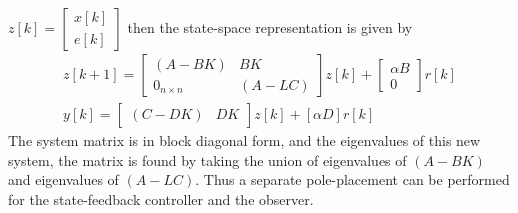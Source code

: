 \documentclass[twoside]{article}
\begin{document}
$z[k] = \left[ \begin{array}{c} x[k] \\ e[k] \end{array} \right]$
then the state-space representation is given by
%
\begin{align*}
  z[k+1] = \left[ \begin{array}{cc} (A - B K) & B K\\ 0_{n \times n}
                                              & (A - LC) \end{array}
                                                \right] z[k] + \left[ \begin{array}{c} \alpha B \\ 0 \end{array} \right] r[k]
\\
 y[k] = \left[ \begin{array}{cc} (C - D K) & D K \end{array}
                                                \right] z[k] + [\alpha D] r[k]
\end{align*}
%
The system matrix is in block diagonal form, and the eigenvalues
of this new system, the matrix is found by taking the union of eigenvalues
of $(A - B K)$ and eigenvalues of $(A - L C)$. Thus a separate
pole-placement can be performed for the state-feedback controller
and the observer. 


\end{document}
